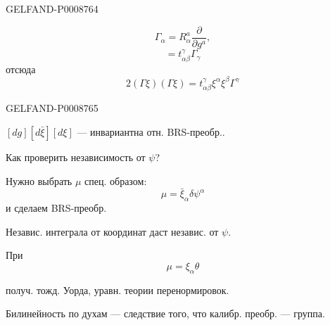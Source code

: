\begin{GelfandAdjacentEvidence}{GELFAND-P000876}{4}


\begin{equation*}
\Gamma_\alpha=R_\alpha^a\frac{\partial}{\partial g^a},
\tag{47}
\end{equation*}
\begin{equation*}
[\Gamma_\alpha,\Gamma_\beta]=t^\gamma_{\alpha\beta}\Gamma_\gamma
\tag{48}
\end{equation*}
отсюда
\begin{equation*}
2(\Gamma\xi)(\Gamma\xi)=t^\gamma_{\alpha\beta}\xi^\alpha\xi^\beta\Gamma^\gamma
\tag{49}
\end{equation*}
\end{GelfandAdjacentEvidence}
\begin{GelfandAdjacentEvidence}{GELFAND-P000876}{5}


$[dg][d\bar\xi][d\xi]$ --- инвариантна отн. BRS-преобр..

Как проверить независимость от $\psi$?

Нужно выбрать $\mu$ спец. образом:
\begin{equation*}
\mu=\bar\xi_\alpha\delta\psi^\alpha
\tag{50}
\end{equation*}
и сделаем BRS-преобр.

Независ. интеграла от координат даст независ. от $\psi$.

При
\begin{equation*}
\mu=\xi_\alpha\theta
\tag{51}
\end{equation*}
\end{GelfandAdjacentEvidence}


получ. тожд. Уорда, уравн. теории перенормировок.

Билинейность по духам --- следствие того, что калибр. преобр. --- группа.


